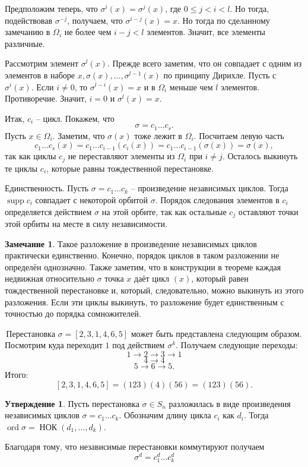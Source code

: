 \documentclass[10pt,a4paper,oneside]{book}
\theoremstyle{definition}
\newtheorem*{rem}{\color{green!50!blue}Замечание}
\newtheorem{utvr}{\color{blue!50!black}Утверждение}
\renewcommand{\leq}{\leqslant}
\newcommand{\ord}{\operatorname{ord}}
\newcommand{\supp}{\operatorname{supp}}
\newcommand{\Nok}{\operatorname{\text{НОК}}}
\def\exm{\noindent {\bf Примеры:}}
\def\rm{\begin{rem}}
\def\erm{\end{rem}}
\def\utv{\begin{utvr}}
\def\eutv{\end{utvr}}
\begin{document}
Предположим теперь, что $\sigma^i(x)=\sigma^j(x)$, где $0\leq j<i<l$. Но тогда, подействовав  $\sigma^{-j}$, получаем, что $\sigma^{i-j}(x)=x$. Но тогда по сделанному замечанию в $\Omega_i$ не более чем $i-j <l$ элементов. Значит, все элементы различные. 

Рассмотрим элемент $\sigma^l(x)$. Прежде всего заметим, что он совпадает с одним из элементов в наборе $x, \sigma(x),\dots,\sigma^{l-1}(x)$ по принципу Дирихле. Пусть с $\sigma^{i}(x)$. Если $i\neq 0$, то $\sigma^{l-i}(x)=x$ и в $\Omega_i$ меньше чем $l$ элементов. Противоречие. Значит, $i=0$ и $\sigma^l(x)=x$.

Итак, $c_i$ -- цикл. Покажем, что 
$$\sigma=c_1\dots c_s.$$
Пусть $x\in \Omega_i$. Заметим, что $\sigma(x)$ тоже лежит в $\Omega_i$. Посчитаем левую часть
$$c_1\dots c_s(x)=c_1\dots c_{i-1} (c_i(x))=c_1\dots c_{i-1} (\sigma(x))=\sigma(x),$$
так как циклы $c_j$ не переставляют элементы из $\Omega_i$ при $i\neq j$. Осталось выкинуть те циклы $c_i$, которые равны тождественной перестановке.

Единственность. Пусть $\sigma= c_1\dots c_k$ -- произведение независимых циклов. Тогда $\supp c_i$ совпадает с некоторой орбитой $\sigma$. Порядок следования элементов в $c_i$ определяется действием $\sigma$ на этой орбите, так как остальные $c_j$ оставляют точки этой орбиты на месте в силу независимости. 
\endproof

\rm Такое разложение в произведение независимых циклов практически единственно. Конечно, порядок циклов в таком разложении не определён однозначно. Также заметим, что в конструкции в теореме каждая недвижная относительно $\sigma$ точка $x$ даёт цикл $(x)$, который равен тождественной перестановке и, который, следовательно, можно выкинуть из этого разложения. 
Если эти циклы выкинуть, то разложение будет единственным с точностью до порядка сомножителей.
\erm

\exm \,Перестановка $\sigma=[2,3,1,4,6,5]$ может быть представлена следующим образом. Посмотрим куда переходит $1$ под действием $\sigma^k$. Получаем следующие переходы:
$$1\to 2\to 3 \to 1$$ 
$$4 \to 4 $$
$$ 5\to 6\to 5.$$
Итого: 
$$[2,3,1,4,6,5]=(123)(4)(56)=(123)(56).$$

\utv Пусть перестановка $\sigma \in S_n$ разложилась в виде произведения  независимых циклов $\sigma=c_1\dots c_k$. Обозначим длину цикла $c_i$  как $d_i$. Тогда $\ord \sigma= \Nok(d_1,\dots,d_k)$.
\eutv
\proof Благодаря тому, что независимые перестановки коммутируют получаем
$$\sigma^d=c_1^d\dots c_k^d$$
\end{document}
